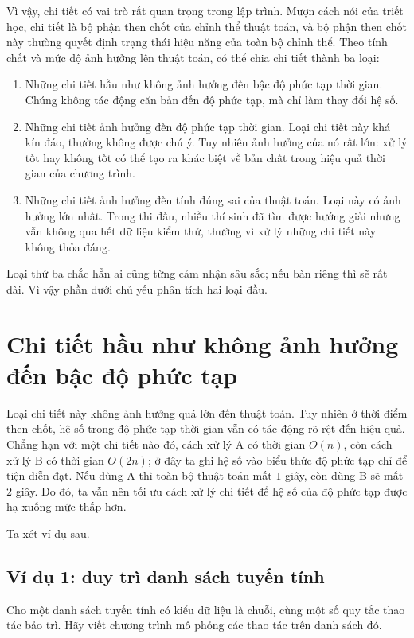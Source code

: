 \documentclass[11pt]{article}
\begin{document}
Vì vậy, chi tiết có vai trò rất quan trọng trong lập trình. Mượn cách nói của
triết học, chi tiết là bộ phận then chốt của chỉnh thể thuật toán, và bộ phận
then chốt này thường quyết định trạng thái hiệu năng của toàn bộ chỉnh thể.
Theo tính chất và mức độ ảnh hưởng lên thuật toán, có thể chia chi tiết thành
ba loại:
\begin{enumerate}
  \item Những chi tiết hầu như không ảnh hưởng đến bậc độ phức tạp thời gian.
  Chúng không tác động căn bản đến độ phức tạp, mà chỉ làm thay đổi hệ số.
  \item Những chi tiết ảnh hưởng đến độ phức tạp thời gian. Loại chi tiết này
  khá kín đáo, thường không được chú ý. Tuy nhiên ảnh hưởng của nó rất lớn:
  xử lý tốt hay không tốt có thể tạo ra khác biệt về bản chất trong hiệu quả
  thời gian của chương trình.
  \item Những chi tiết ảnh hưởng đến tính đúng sai của thuật toán. Loại này
  có ảnh hưởng lớn nhất. Trong thi đấu, nhiều thí sinh đã tìm được hướng giải
  nhưng vẫn không qua hết dữ liệu kiểm thử, thường vì xử lý những chi tiết này
  không thỏa đáng.
\end{enumerate}

Loại thứ ba chắc hẳn ai cũng từng cảm nhận sâu sắc; nếu bàn riêng thì sẽ rất
dài. Vì vậy phần dưới chủ yếu phân tích hai loại đầu.

\section{Chi tiết hầu như không ảnh hưởng đến bậc độ phức tạp}

Loại chi tiết này không ảnh hưởng quá lớn đến thuật toán. Tuy nhiên ở thời
điểm then chốt, hệ số trong độ phức tạp thời gian vẫn có tác động rõ rệt đến
hiệu quả. Chẳng hạn với một chi tiết nào đó, cách xử lý A có thời gian
$O(n)$, còn cách xử lý B có thời gian $O(2n)$; ở đây ta ghi hệ số vào biểu
thức độ phức tạp chỉ để tiện diễn đạt. Nếu dùng A thì toàn bộ thuật toán mất
$1$ giây, còn dùng B sẽ mất $2$ giây. Do đó, ta vẫn nên tối ưu cách xử lý chi
tiết để hệ số của độ phức tạp được hạ xuống mức thấp hơn.

Ta xét ví dụ sau.

\subsection{Ví dụ 1: duy trì danh sách tuyến tính}

Cho một danh sách tuyến tính có kiểu dữ liệu là chuỗi, cùng một số quy tắc
thao tác bảo trì. Hãy viết chương trình mô phỏng các thao tác trên danh sách
đó.
\end{document}
